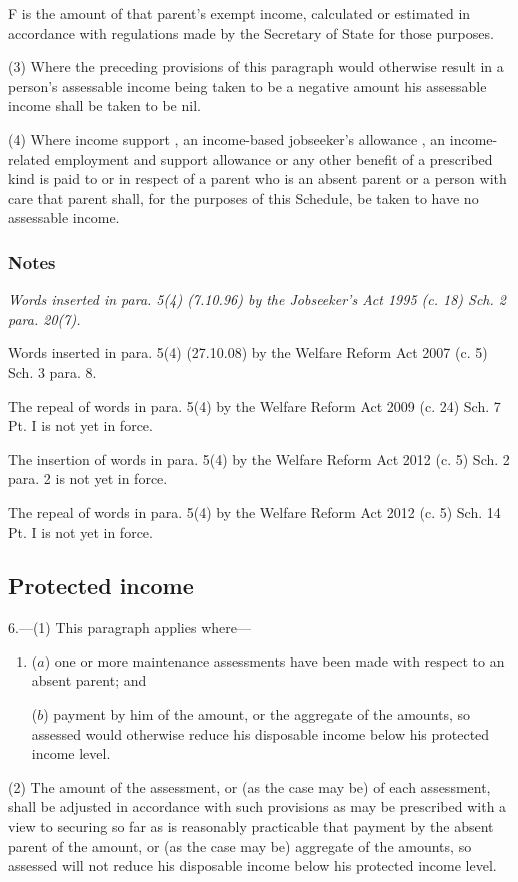 \documentclass[a4paper]{article}
\newcommand\amendment[1]{\subsubsection*{Notes}{\itshape\frenchspacing\footnotesize #1 \par}}
\begin{document}
{\begin{enumerate}
F is the amount of that parent’s exempt income, calculated or estimated in accordance with regulations made by the Secretary of State for those purposes.
\end{enumerate}

(3) Where the preceding provisions of this paragraph would otherwise result in a person’s assessable income being taken to be a negative amount his assessable income shall be taken to be nil.

(4) Where income support%
, an income-based jobseeker’s allowance%
, an income-related employment and support allowance
 or any other benefit of a prescribed kind is paid to or in respect of a parent who is an absent parent or a person with care that parent shall, for the purposes of this Schedule, be taken to have no assessable income.

\amendment{
Words inserted in para. 5(4) (7.10.96) by the Jobseeker's Act 1995 (c. 18) Sch. 2 para. 20(7).

Words inserted in para. 5(4) (27.10.08) by the Welfare Reform Act 2007 (c. 5) Sch. 3 para. 8.

The repeal of words in para. 5(4) by the Welfare Reform Act 2009 (c. 24) Sch. 7 Pt. I is not yet in force.

The insertion of words in para. 5(4) by the Welfare Reform Act 2012 (c. 5) Sch. 2 para. 2 is not yet in force.

The repeal of words in para. 5(4) by the Welfare Reform Act 2012 (c. 5) Sch. 14 Pt. I is not yet in force.
}

\subsection*{Protected income}

6.---(1) This paragraph applies where---
\begin{enumerate}\item[]
($a$) one or more maintenance assessments have been made with respect to an absent parent; and

($b$) payment by him of the amount, or the aggregate of the amounts, so assessed would otherwise reduce his disposable income below his protected income level.
\end{enumerate}

(2) The amount of the assessment, or (as the case may be) of each assessment, shall be adjusted in accordance with such provisions as may be prescribed with a view to securing so far as is reasonably practicable that payment by the absent parent of the amount, or (as the case may be) aggregate of the amounts, so assessed will not reduce his disposable income below his protected income level.

}
\end{document}
